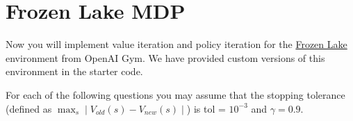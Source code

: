 \section{Frozen Lake MDP}

Now you will implement value iteration and policy iteration for the  \href{https://www.gymlibrary.ml/environments/toy_text/frozen_lake/}{Frozen Lake} environment
from OpenAI Gym. We have provided
custom versions of this environment in the starter code.

For each of the following questions you may assume that the stopping tolerance (defined as $\max_s \mid V_{old}(s) - V_{new}(s) \mid $) is tol = $10^{-3}$ and $\gamma = 0.9$.

\begin{enumerate}[(a)]

	

	

	

	

	

\end{enumerate}
